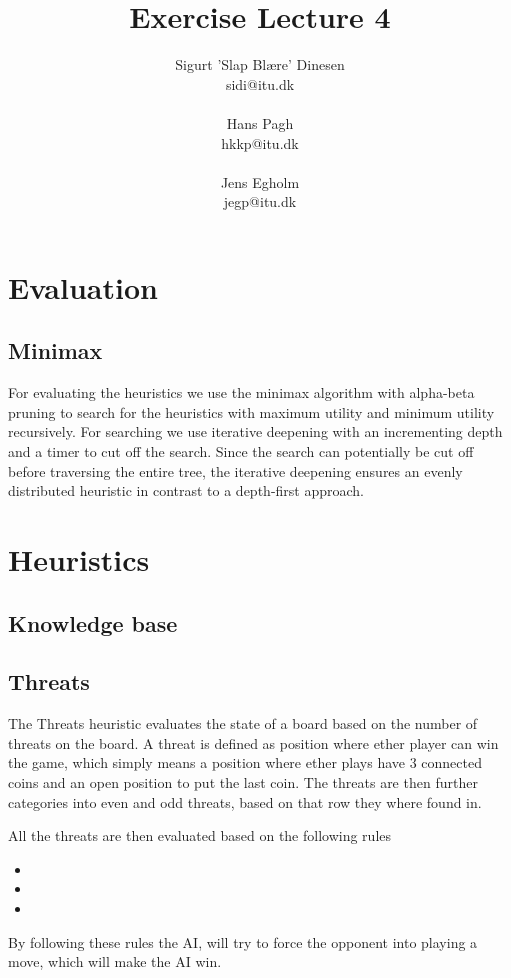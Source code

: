 \documentclass[a4paper, titlepage]{article}
\begin{document}
\title{Exercise Lecture 4}
\author{Sigurt 'Slap Blære' Dinesen \\sidi@itu.dk \\\\ Hans Pagh \\hkkp@itu.dk 
\\\\Jens Egholm \\jegp@itu.dk}
\maketitle
\pagebreak

\section*{Evaluation}
\subsection*{Minimax}
For evaluating the heuristics we use the minimax algorithm with alpha-beta pruning to
search for the heuristics with maximum utility and minimum utility recursively. 
For searching we use iterative deepening with an incrementing depth and a timer to cut off
the search. Since the search can potentially be cut off before traversing the entire tree, 
the iterative deepening ensures an evenly distributed heuristic in contrast to a depth-first
approach.

\section*{Heuristics}
\subsection*{Knowledge base}


\subsection*{Threats}
The Threats heuristic evaluates the state of a board based on the number of threats on the board. 
A threat is defined as position where ether player can win the game, which simply means a position
where ether plays have 3 connected coins and an open position to put the last coin. 
The threats are then further categories into even and odd threats, based on that row they where found in.
 
All the threats are then evaluated based on the following rules
\begin{itemize} 
	\item 
	\item
	\item
\end{itemize} 
By following these rules the AI, will try to force the opponent into playing a move, which will make the AI win. 
\end{document}
